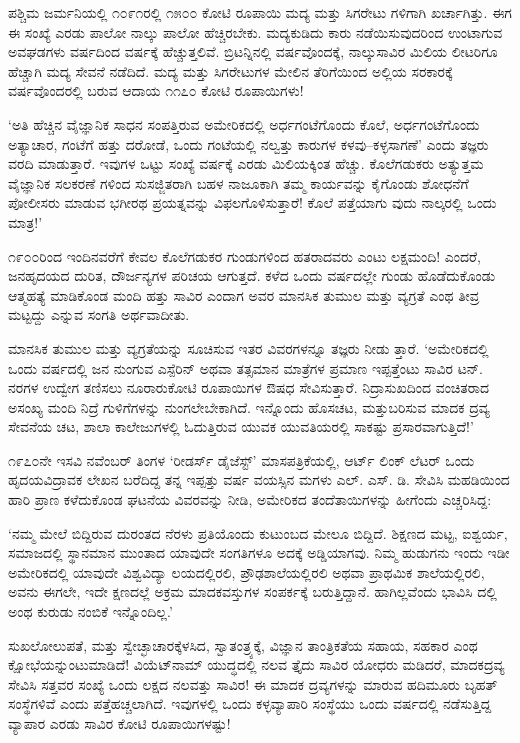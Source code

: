 ಪಶ್ಚಿಮ ಜರ್ಮನಿಯಲ್ಲಿ ೧೦೯೧ರಲ್ಲಿ ೧೫೦೦ ಕೋಟಿ ರೂಪಾಯಿ ಮದ್ಯ ಮತ್ತು ಸಿಗರೇಟು ಗಳಿಗಾಗಿ ಖರ್ಚಾಗಿತ್ತು. ಈಗ ಈ ಸಂಖ್ಯೆ ಎರಡು ಪಾಲೋ ನಾಲ್ಕು ಪಾಲೋ ಹೆಚ್ಚಿರಬೇಕು. ಮದ್ಯಕುಡಿದು ಕಾರು ನಡೆಯಿಸುವುದರಿಂದ ಉಂಟಾಗುವ ಅವಘಡಗಳು ವರ್ಷದಿಂದ ವರ್ಷಕ್ಕೆ ಹೆಚ್ಚುತ್ತಲಿವೆ. ಬ್ರಿಟನ್ನಿನಲ್ಲಿ ವರ್ಷವೊಂದಕ್ಕೆ, ನಾಲ್ಕುಸಾವಿರ ಮಿಲಿಯ ಲೀಟರಿಗೂ ಹೆಚ್ಚಾಗಿ ಮದ್ಯ ಸೇವನೆ ನಡೆದಿದೆ. ಮದ್ಯ ಮತ್ತು ಸಿಗರೇಟುಗಳ ಮೇಲಿನ ತೆರಿಗೆಯಿಂದ ಅಲ್ಲಿಯ ಸರಕಾರಕ್ಕೆ ವರ್ಷವೊಂದರಲ್ಲಿ ಬರುವ ಆದಾಯ ೧೧೭೦ ಕೋಟಿ ರೂಪಾಯಿಗಳು!

‘ಅತಿ ಹೆಚ್ಚಿನ ವೈಜ್ಞಾನಿಕ ಸಾಧನ ಸಂಪತ್ತಿರುವ ಅಮೇರಿಕದಲ್ಲಿ ಅರ್ಧಗಂಟೆಗೊಂದು ಕೊಲೆ, ಅರ್ಧಗಂಟೆಗೊಂದು ಅತ್ಯಾಚಾರ, ಗಂಟೆಗೆ ಹತ್ತು ದರೋಡೆ, ಒಂದು ಗಂಟೆಯಲ್ಲಿ ನಲ್ವತ್ತು ಕಾರುಗಳ ಕಳವು–ಕಳ್ಳಸಾಗಣೆ’ ಎಂದು ತಜ್ಞರು ವರದಿ ಮಾಡುತ್ತಾರೆ. ಇವುಗಳ ಒಟ್ಟು ಸಂಖ್ಯೆ ವರ್ಷಕ್ಕೆ ಎರಡು ಮಿಲಿಯಕ್ಕಿಂತ ಹೆಚ್ಚು. ಕೊಲೆಗಡುಕರು ಅತ್ಯುತ್ತಮ ವೈಜ್ಞಾನಿಕ ಸಲಕರಣೆ ಗಳಿಂದ ಸುಸಜ್ಜಿತರಾಗಿ ಬಹಳ ನಾಜೂಕಾಗಿ ತಮ್ಮ ಕಾರ್ಯವನ್ನು ಕೈಗೊಂಡು ಶೋಧನೆಗೆ ಪೋಲೀಸರು ಮಾಡುವ ಭಗೀರಥ ಪ್ರಯತ್ನವನ್ನು ವಿಫಲಗೊಳಿಸುತ್ತಾರೆ! ಕೊಲೆ ಪತ್ತೆಯಾಗು ವುದು ನಾಲ್ಕರಲ್ಲಿ ಒಂದು ಮಾತ್ರ!’

೧೯೦೦ರಿಂದ ಇಂದಿನವರೆಗೆ ಕೇವಲ ಕೊಲೆಗಡುಕರ ಗುಂಡುಗಳಿಂದ ಹತರಾದವರು ಎಂಟು ಲಕ್ಷಮಂದಿ! ಎಂದರೆ, ಜನಹೃದಯದ ದುರಿತ, ದೌರ್ಜನ್ಯಗಳ ಪರಿಚಯ ಆಗುತ್ತದೆ. ಕಳೆದ ಒಂದು ವರ್ಷದಲ್ಲೇ ಗುಂಡು ಹೊಡೆದುಕೊಂಡು ಆತ್ಮಹತ್ಯೆ ಮಾಡಿಕೊಂಡ ಮಂದಿ ಹತ್ತು ಸಾವಿರ ಎಂದಾಗ ಅವರ ಮಾನಸಿಕ ತುಮುಲ ಮತ್ತು ವ್ಯಗ್ರತೆ ಎಂಥ ತೀವ್ರ ಮಟ್ಟದ್ದು ಎನ್ನುವ ಸಂಗತಿ ಅರ್ಥವಾದೀತು.

ಮಾನಸಿಕ ತುಮುಲ ಮತ್ತು ವ್ಯಗ್ರತೆಯನ್ನು ಸೂಚಿಸುವ ಇತರ ವಿವರಗಳನ್ನೂ ತಜ್ಞರು ನೀಡು ತ್ತಾರೆ. ‘ಅಮೇರಿಕದಲ್ಲಿ ಒಂದು ವರ್ಷದಲ್ಲಿ ಜನ ನುಂಗುವ ಎಸ್ಪೆರಿನ್ ಅಥವಾ ತತ್ಸಮಾನ ಮಾತ್ರೆಗಳ ಪ್ರಮಾಣ ಇಪ್ಪತ್ತೆಂಟು ಸಾವಿರ ಟನ್. ನರಗಳ ಉದ್ವೇಗ ತಣಿಸಲು ನೂರಾರುಕೋಟಿ ರೂಪಾಯಿಗಳ ಔಷಧ ಸೇವಿಸುತ್ತಾರೆ. ನಿದ್ರಾಸುಖದಿಂದ ವಂಚಿತರಾದ ಅಸಂಖ್ಯ ಮಂದಿ ನಿದ್ರೆ ಗುಳಿಗೆಗಳನ್ನು ನುಂಗಲೇಬೇಕಾಗಿದೆ. ಇನ್ನೊಂದು ಹೊಸಚಟ, ಮತ್ತುಬರಿಸುವ ಮಾದಕ ದ್ರವ್ಯ ಸೇವನೆಯ ಚಟ, ಶಾಲಾ ಕಾಲೇಜುಗಳಲ್ಲಿ ಓದುತ್ತಿರುವ ಯುವಕ ಯುವತಿಯರಲ್ಲಿ ಸಾಕಷ್ಟು ಪ್ರಸಾರವಾಗುತ್ತಿದೆ!’

೧೯೭೦ನೇ ಇಸವಿ ನವೆಂಬರ್ ತಿಂಗಳ ‘ರೀಡರ್ಸ್ ಡೈಜೆಸ್ಟ್​’ ಮಾಸಪತ್ರಿಕೆಯಲ್ಲಿ, ಆರ್ಟ್ ಲಿಂಕ್ ಲೆಟರ್ ಒಂದು ಹೃದಯವಿದ್ರಾವಕ ಲೇಖನ ಬರೆದಿದ್ದ ತನ್ನ ಇಪ್ಪತ್ತು ವರ್ಷ ವಯಸ್ಸಿನ ಮಗಳು ಎಲ್. ಎಸ್. ಡಿ. ಸೇವಿಸಿ ಮಹಡಿಯಿಂದ ಹಾರಿ ಪ್ರಾಣ ಕಳೆದುಕೊಂಡ ಘಟನೆಯ ವಿವರವನ್ನು ನೀಡಿ, ಅಮೇರಿಕದ ತಂದೆತಾಯಿಗಳನ್ನು ಹೀಗೆಂದು ಎಚ್ಚರಿಸಿದ್ದ:

‘ನಮ್ಮ ಮೇಲೆ ಬಿದ್ದಿರುವ ದುರಂತದ ನೆರಳು ಪ್ರತಿಯೊಂದು ಕುಟುಂಬದ ಮೇಲೂ ಬಿದ್ದಿದೆ. ಶಿಕ್ಷಣದ ಮಟ್ಟ, ಐಶ್ವರ್ಯ, ಸಮಾಜದಲ್ಲಿ ಸ್ಥಾನಮಾನ ಮುಂತಾದ ಯಾವುದೇ ಸಂಗತಿಗಳೂ ಅದಕ್ಕೆ ಅಡ್ಡಿಯಾಗವು. ನಿಮ್ಮ ಹುಡುಗನು ಇಂದು ಇಡೀ ಅಮೇರಿಕದಲ್ಲಿ ಯಾವುದೇ ವಿಶ್ವವಿದ್ಯಾ ಲಯದಲ್ಲಿರಲಿ, ಪ್ರೌಢಶಾಲೆಯಲ್ಲಿರಲಿ ಅಥವಾ ಪ್ರಾಥಮಿಕ ಶಾಲೆಯಲ್ಲಿರಲಿ, ಅವನು ಈಗಲೇ, ಇದೇ ಕ್ಷಣದಲ್ಲೆ ಅಕ್ರಮ ಮಾದಕವಸ್ತುಗಳ ಸಂಪರ್ಕಕ್ಕೆ ಬರುತ್ತಿದ್ದಾನೆ. ಹಾಗಿಲ್ಲವೆಂದು ಭಾವಿಸಿ ದಲ್ಲಿ ಅಂಥ ಕುರುಡು ನಂಬಿಕೆ ಇನ್ನೊಂದಿಲ್ಲ.’

ಸುಖಲೋಲುಪತೆ, ಮತ್ತು ಸ್ವೇಚ್ಛಾಚಾರಕ್ಕೆಳಸಿದ, ಸ್ವಾತಂತ್ರ್ಯಕ್ಕೆ, ವಿಜ್ಞಾನ ತಾಂತ್ರಿಕತೆಯ ಸಹಾಯ, ಸಹಕಾರ ಎಂಥ ಕ್ಷೋಭೆಯನ್ನುಂಟುಮಾಡಿದೆ! ವಿಯೆಟ್​ನಾಮ್ ಯುದ್ಧದಲ್ಲಿ ನಲವ ತ್ತೈದು ಸಾವಿರ ಯೋಧರು ಮಡಿದರೆ, ಮಾದಕದ್ರವ್ಯ ಸೇವಿಸಿ ಸತ್ತವರ ಸಂಖ್ಯೆ ಒಂದು ಲಕ್ಷದ ನಲವತ್ತು ಸಾವಿರ! ಈ ಮಾದಕ ದ್ರವ್ಯಗಳನ್ನು ಮಾರುವ ಹದಿಮೂರು ಬೃಹತ್ ಸಂಸ್ಥೆಗಳಿವೆ ಎಂದು ಪತ್ತೆಹಚ್ಚಲಾಗಿದೆ. ಇವುಗಳಲ್ಲಿ ಒಂದು ಕಳ್ಳವ್ಯಾಪಾರಿ ಸಂಸ್ಥೆಯು ಒಂದು ವರ್ಷದಲ್ಲಿ ನಡೆಸುತ್ತಿದ್ದ ವ್ಯಾಪಾರ ಎರಡು ಸಾವಿರ ಕೋಟಿ ರೂಪಾಯಿಗಳಷ್ಟು!


